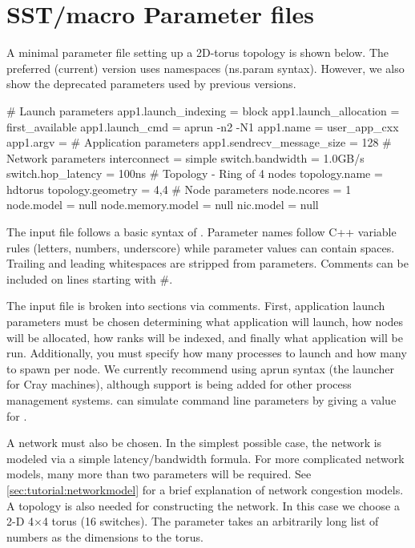 
\section{SST/macro Parameter files}
\label{sec:parameters}
A minimal parameter file setting up a 2D-torus topology is shown below. 
The preferred (current) version uses namespaces (ns.param syntax).
However, we also show the deprecated parameters used by previous versions.

\begin{ViFile}
# Launch parameters
app1.launch_indexing = block
app1.launch_allocation = first_available
app1.launch_cmd = aprun -n2 -N1
app1.name = user_app_cxx
app1.argv = 
# Application parameters
app1.sendrecv_message_size = 128
# Network parameters
interconnect = simple
switch.bandwidth = 1.0GB/s
switch.hop_latency = 100ns
# Topology - Ring of 4 nodes
topology.name = hdtorus
topology.geometry = 4,4
# Node parameters
node.ncores = 1
node.model = null
node.memory.model = null
nic.model = null
\end{ViFile}
The input file follows a basic syntax of .  
Parameter names follow C++ variable rules (letters, numbers, underscore) while parameter values can contain spaces.  Trailing and leading whitespaces are stripped from parameters.
Comments can be included on lines starting with \#.

The input file is broken into sections via comments.  
First, application launch parameters must be chosen determining what application will launch, 
how nodes will be allocated, how ranks will be indexed, and finally what application will be run.  
Additionally, you must specify how many processes to launch and how many to spawn per node.  
We currently recommend using aprun syntax (the launcher for Cray machines), 
although support is being added for other process management systems.
\sstmacro can simulate command line parameters by giving a value for .

A network must also be chosen.  
In the simplest possible case, the network is modeled via a simple latency/bandwidth formula.  
For more complicated network models, many more than two parameters will be required. 
See \ref{sec:tutorial:networkmodel} for a brief explanation of \sstmacro network congestion models. 
A topology is also needed for constructing the network.  
In this case we choose a 2-D 4$\times$4 torus (16 switches).  The  
parameter takes an arbitrarily long list of numbers as the dimensions to the torus.

